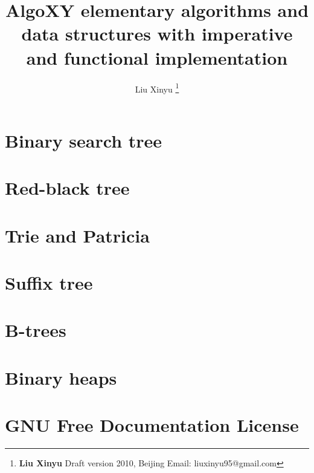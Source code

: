 \documentclass[a4paper,twoside]{book} %
\begin{document}


\title{{\bf \Huge AlgoXY} elementary algorithms and data structures \newline
            with imperative and functional implementation \newline
            \newline
            }

\author{Liu Xinyu
  \thanks{{\bfseries Liu Xinyu } \newline
    Draft version 2010, Beijing \newline
    Email: liuxinyu95@gmail.com \newline
    }}

\maketitle

%
\tableofcontents
\newpage

\part{Binary search tree}


\part{Red-black tree}


\part{Trie and Patricia}


\part{Suffix tree}


\part{B-trees}


\part{Binary heaps}


\part{GNU Free Documentation License}

\end{document}
